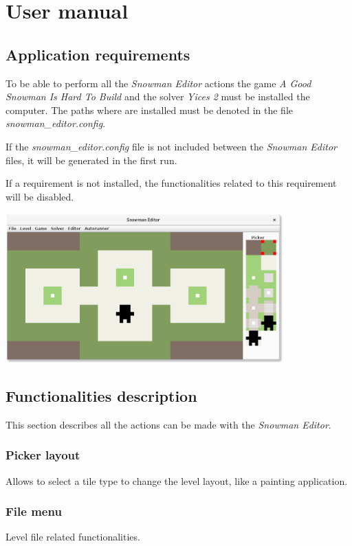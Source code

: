 \documentclass{report}
\theoremstyle{plain}
\begin{document}
\chapter{User manual}
\section{Application requirements}
To be able to perform all the \emph{Snowman Editor} actions the game \emph{A Good Snowman Is Hard To Build} and the solver \emph{Yices 2} must be installed the computer. The paths where are installed must be denoted in the file  \emph{snowman\_editor.config}. 

If the \emph{snowman\_editor.config} file is not included between the \emph{Snowman Editor} files, it will be generated in the first run.

If a requirement is not installed, the functionalities related to this requirement will be disabled.

\begin{center}
\includegraphics[width=0.8\textwidth]{gui-3.png}
\end{center}

\section{Functionalities description}
This section describes all the actions can be made with the \emph{Snowman Editor}.

\subsection{Picker layout}
Allows to select a tile type to change the level layout, like a painting application.

\subsection{File menu}
Level file related functionalities.
\end{document}

